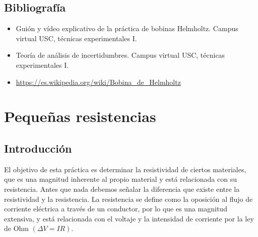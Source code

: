\documentclass[a4paper,12pt,titlepage]{report}
\begin{document}
\section{Bibliografía}

\begin{itemize}
    \item Guión y vídeo explicativo de la práctica de bobinas Helmholtz. Campus virtual USC, técnicas experimentales I.
    \item Teoría de análisis de incertidumbres. Campus virtual USC, técnicas experimentales I.
    \item \url{https://es.wikipedia.org/wiki/Bobina_de_Helmholtz}
\end{itemize}

\chapter{Pequeñas resistencias}

\section{Introducción}

El objetivo de esta práctica es determinar la resistividad de ciertos materiales, que es una magnitud inherente al propio material y está relacionada con su resistencia. Antes que nada debemos señalar la diferencia que existe entre la resistividad y la resistencia. La resistencia se define como la oposición al flujo de corriente eléctrica a través de un conductor, por lo que es una magnitud extensiva, y está relacionada con el voltaje y la intensidad de corriente por la ley de Ohm $(\Delta V = IR)$.
\end{document}
